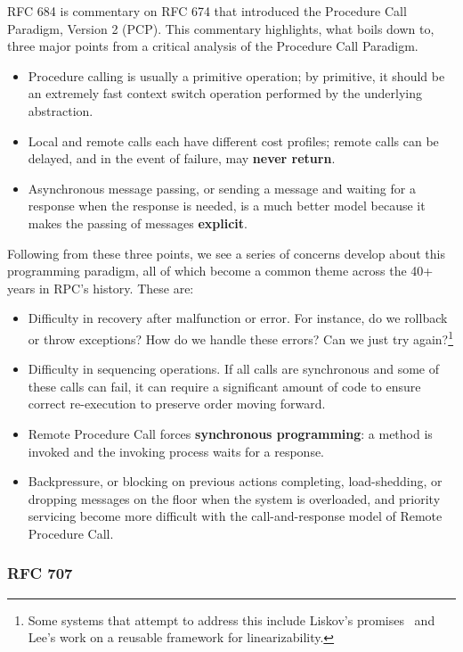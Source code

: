 RFC 684 is commentary on RFC 674 that introduced the Procedure Call Paradigm, Version 2 (PCP).  This commentary highlights, what boils down to, three major points from a critical analysis of the Procedure Call Paradigm. 

\begin{itemize}
	\item Procedure calling is usually a primitive operation; by primitive, it should be an extremely fast context switch operation performed by the underlying abstraction.
	\item Local and remote calls each have different cost profiles; remote calls can be delayed, and in the event of failure,  may \textbf{never return}.
	\item Asynchronous message passing, or sending a message and waiting for a response when the response is needed, is a much better model because it makes the passing of messages \textbf{explicit}.
\end{itemize}

Following from these three points, we see a series of concerns develop about this programming paradigm, all of which become a common theme across the 40+ years in RPC's history.  These are:

\begin{itemize}
	\item Difficulty in recovery after malfunction or error.  For instance, do we rollback or throw exceptions?  How do we handle these errors?  Can we just try again?\footnote{Some systems that attempt to address this include Liskov's promises~\cite{liskov1988promises} and Lee's \cite{lee2015implementing} work on a reusable framework for linearizability.}
	\item Difficulty in sequencing operations.  If all calls are synchronous and some of these calls can fail, it can require a significant amount of code to ensure correct re-execution to preserve order moving forward. 
	\item Remote Procedure Call forces \textbf{synchronous programming}: a method is invoked and the invoking process waits for a response.
	\item Backpressure, or blocking on previous actions completing, load-shedding, or dropping messages on the floor when the system is overloaded, and priority servicing become more difficult with the call-and-response model of Remote Procedure Call.
\end{itemize}

\subsubsection{RFC 707}

